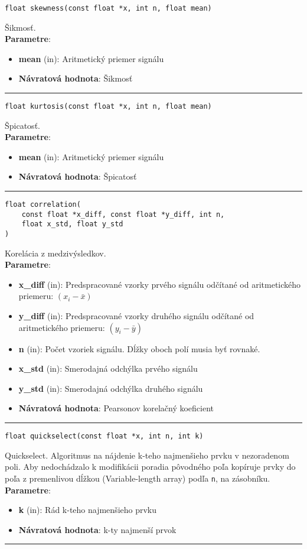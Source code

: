 \begin{lstlisting}[style=docs]
float skewness(const float *x, int n, float mean)
\end{lstlisting}
Šikmosť. \\ 
\textbf{Parametre}:
\begin{itemize}[noitemsep, topsep=0pt]
	\item \textbf{mean} (in): Aritmetický priemer signálu
	\item \textbf{Návratová hodnota}:  Šikmosť
\end{itemize}
\bigbreak
\hrule

\begin{lstlisting}[style=docs]
float kurtosis(const float *x, int n, float mean)
\end{lstlisting}
Špicatosť. \\ 
\textbf{Parametre}:
\begin{itemize}[noitemsep, topsep=0pt]
	\item \textbf{mean} (in): Aritmetický priemer signálu
	\item \textbf{Návratová hodnota}:  Špicatosť
\end{itemize}
\bigbreak
\hrule

\begin{lstlisting}[style=docs]
float correlation(
	const float *x_diff, const float *y_diff, int n, 
	float x_std, float y_std
)
\end{lstlisting}
Korelácia z medzivýsledkov. \\ 
\textbf{Parametre}:
\begin{itemize}[noitemsep, topsep=0pt]
	\item \textbf{x\_diff} (in):  Predspracované vzorky prvého signálu odčítané od aritmetického priemeru: $(x_i - \bar{x})$
	\item \textbf{y\_diff} (in):  Predspracované vzorky druhého signálu odčítané od aritmetického priemeru: $(y_i - \bar{y})$
	\item \textbf{n} (in): Počet vzoriek signálu. Dĺžky oboch polí musia byť rovnaké.
	\item \textbf{x\_std} (in): Smerodajná odchýlka prvého signálu
	\item \textbf{y\_std} (in): Smerodajná odchýlka druhého signálu
	\item \textbf{Návratová hodnota}:  Pearsonov korelačný koeficient
\end{itemize}
\bigbreak
\hrule

\begin{lstlisting}[style=docs]
float quickselect(const float *x, int n, int k)
\end{lstlisting}
Quickselect. Algoritmus na nájdenie k-teho najmenšieho prvku v nezoradenom poli. Aby nedochádzalo
k modifikácii poradia pôvodného poľa kopíruje prvky do poľa z premenlivou dĺžkou (Variable-length array) 
 podľa \verb|n|, na zásobníku. \\ 
\textbf{Parametre}:
\begin{itemize}[noitemsep, topsep=0pt]
	\item \textbf{k} (in): Rád k-teho najmenšieho prvku
	\item \textbf{Návratová hodnota}: k-ty najmenší prvok
\end{itemize}
\bigbreak
\hrule

